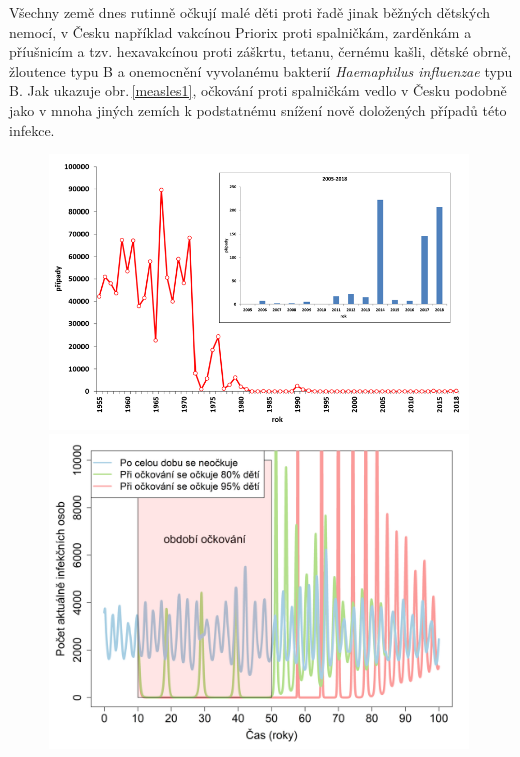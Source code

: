 Všechny země dnes rutinně očkují malé děti proti řadě jinak běžných dětských nemocí, v Česku například vakcínou Priorix proti spalničkám, zarděnkám a příušnicím a tzv. hexavakcínou proti záškrtu, tetanu, černému kašli, dětské obrně, žloutence typu B a onemocnění vyvolanému bakterií \emph{Haemaphilus influenzae} typu B. Jak ukazuje obr.\,\ref{measles1}, očkování proti spalničkám vedlo v Česku podobně jako v mnoha jiných zemích k podstatnému snížení nově doložených případů této infekce.

\begin{figure}[h]
	\begin{center}
		\begin{minipage}[m]{0.45\linewidth}
			\includegraphics[width=0.99\textwidth]{pic/measles_data.png}
		\end{minipage}
		\hspace{2ex}
		\begin{minipage}[m]{0.45\linewidth}
			\includegraphics[width=0.99\textwidth]{pic/spalnicky2.png}

\end{minipage}
\end{center}
\end{figure}
